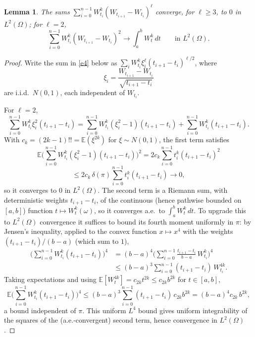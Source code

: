 \documentclass[11pt,fleqn]{article}
\def\E{\mathbb E}
\theoremstyle{plain}
\newtheorem{lemma}[thm]{Lemma}
\theoremstyle{remark}
\begin{document}
\begin{lemma}\label{lem:l1}
The sums $\sum_{i=0}^{n-1}W_{t_i}^k(W_{t_{i+1}}-W_{t_i})^\ell$ converge, for
$\ell\ge3$, to $0$ in $L^2(\Omega)$; for $\ell=2$,
\[
\sum_{i=0}^{n-1}W_{t_i}^k(W_{t_{i+1}}-W_{t_i})^2\longrightarrow\int_a^bW_t^k\,dt
\qquad\text{in }L^2(\Omega).
\]
\end{lemma}
\begin{proof}
Write the sum in \eqref{e4} below as $\sum_i W_{t_i}^k\xi_i^\ell(t_{i+1}-t_i)^{\ell/2}$,
where
\begin{equation}\label{e4}
\xi_i=\frac{W_{t_{i+1}}-W_{t_i}}{\sqrt{t_{i+1}-t_i}}
\end{equation}
are i.i.d.\ $N(0,1)$, each independent of $W_{t_i}$.

For $\ell=2$,
\[
\sum_{i=0}^{n-1}W_{t_i}^k\xi_i^2(t_{i+1}-t_i)=
\sum_{i=0}^{n-1}W_{t_i}^k(\xi_i^2-1)(t_{i+1}-t_i)+\sum_{i=0}^{n-1}W_{t_i}^k(t_{i+1}-t_i).
\]
With $c_k=(2k-1)!!=\E(\xi^{2k})$ for $\xi\sim N(0,1)$, the first term satisfies
\[
\E\Big(\sum_{i=0}^{n-1}W_{t_i}^k(\xi_i^2-1)(t_{i+1}-t_i)\Big)^2
=2c_k\sum_{i=0}^{n-1}t_i^k(t_{i+1}-t_i)^2
\]
\[
\le2c_k\,\delta(\pi)\sum_{i=0}^{n-1}t_i^k(t_{i+1}-t_i)\longrightarrow0,
\]
so it converges to $0$ in $L^2(\Omega)$. The second term is a Riemann sum,
with deterministic weights $t_{i+1}-t_i$, of the continuous (hence
pathwise bounded on $[a,b]$) function $t\mapsto W_t^k(\omega)$, so it
converges a.e.\ to $\int_a^bW_t^k\,dt$. To upgrade this to $L^2(\Omega)$
convergence it suffices to bound its fourth moment uniformly in $\pi$: by
Jensen's inequality, applied to the convex function $x\mapsto x^4$ with
the weights $(t_{i+1}-t_i)/(b-a)$ (which sum to $1$),
\begin{align*}
\Big(\sum_{i=0}^{n-1}W_{t_i}^k(t_{i+1}-t_i)\Big)^4
&=(b-a)^4\Big(\sum_{i=0}^{n-1}\frac{t_{i+1}-t_i}{b-a}\,W_{t_i}^k\Big)^4\\
&\le(b-a)^3\sum_{i=0}^{n-1}(t_{i+1}-t_i)\,W_{t_i}^{4k}.
\end{align*}
Taking expectations and using $\E[W_t^{4k}]=c_{2k}t^{2k}\le c_{2k}b^{2k}$
for $t\in[a,b]$,
\[
\E\Big(\sum_{i=0}^{n-1}W_{t_i}^k(t_{i+1}-t_i)\Big)^4
\le(b-a)^3\sum_{i=0}^{n-1}(t_{i+1}-t_i)\,c_{2k}b^{2k}=(b-a)^4c_{2k}\,b^{2k},
\]
a bound independent of $\pi$. This uniform $L^4$ bound gives uniform
integrability of the squares of the (a.e.-convergent) second term, hence
convergence in $L^2(\Omega)$.


\end{proof}
\end{document}

